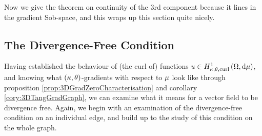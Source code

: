 \begin{theorem} \label{thm:TangCurlGraph}
\end{theorem}

Now we give the theorem on continuity of the 3rd component because it lines in the gradient Sob-space, and this wraps up this section quite nicely.

\subsection{The Divergence-Free Condition} \label{apps:DivFreeEdge}
Having established the behaviour of (the curl of) functions $u\in H^1_{\kappa,\theta,\mathrm{curl}}\left( \Omega, \mathrm{d}\mu \right)$, and knowing what $\left( \kappa, \theta \right)$-gradients with respect to $\mu$ look like through proposition \ref{prop:3DGradZeroCharacterisation} and corollary \ref{cory:3DTangGradGraph}, we can examine what it means for a vector field to be divergence free.
Again, we begin with an examination of the divergence-free condition on an individual edge, and build up to the study of this condition on the whole graph.